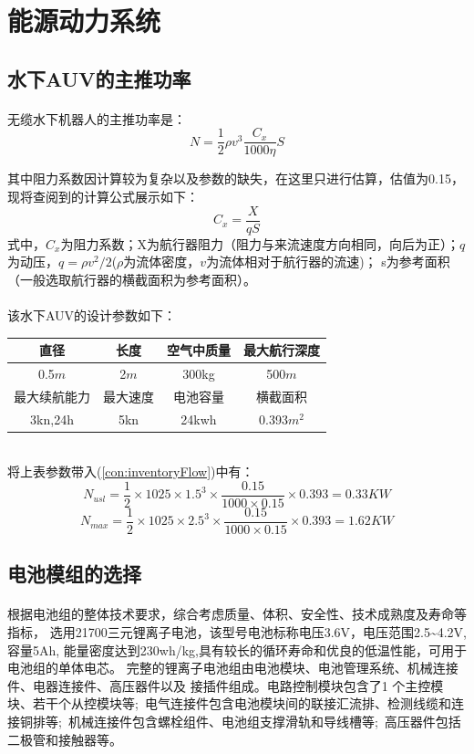 \documentclass{ctexart}
\begin{document}
\section{能源动力系统}
\subsection{水下AUV的主推功率}
\paragraph{}无缆水下机器人的主推功率是：
\begin{equation}
    N=\frac{1}{2}\rho v^3\frac{C_x}{1000\eta}S\label{con:inventoryFlow}
\end{equation}

其中阻力系数因计算较为复杂以及参数的缺失，在这里只进行估算，估值为0.15，现将查阅到的计算公式展示如下：
\[C_x=\frac{X}{qS}\]
式中，$C_x$为阻力系数；X为航行器阻力（阻力与来流速度方向相同，向后为正）；$q$为动压，$q=\rho v^2/2$($\rho$为流体密度，$v$为流体相对于航行器的流速)；
s为参考面积（一般选取航行器的横截面积为参考面积）。
\paragraph{}该水下AUV的设计参数如下： \\
\begin{tabular}{|c|c|c|c|}
    \hline
    直径&长度&空气中质量&最大航行深度 \\
    \hline
    0.5$m$&2$m$&300kg&500$m$ \\
    \hline
    最大续航能力&最大速度&电池容量&横截面积 \\
    \hline
    3kn,24h&5kn&24kwh&0.393$m^2$ \\
    \hline
\end{tabular}\\
将上表参数带入(\ref{con:inventoryFlow})中有：
\[N_{usl}=\frac{1}{2}\times 1025\times 1.5^3 \times \frac{0.15}{1000\times 0.15}\times 0.393=0.33KW\]
\[N_{max}=\frac{1}{2}\times 1025\times 2.5^3 \times \frac{0.15}{1000\times 0.15}\times 0.393=1.62KW\]
\subsection{电池模组的选择}
\paragraph{}根据电池组的整体技术要求，综合考虑质量、体积、安全性、技术成熟度及寿命等指标，
            选用21700三元锂离子电池，该型号电池标称电压3.6V，电压范围2.5\~{}4.2V,容量5Ah,
            能量密度达到230wh/kg,具有较长的循环寿命和优良的低温性能，可用于电池组的单体电芯。
            完整的锂离子电池组由电池模块、电池管理系统、机械连接件、电器连接件、高压器件以及
            接插件组成。电路控制模块包含了1 个主控模块、若干个从控模块等; 电气连接件包含电池模块间的联接汇流排、检测线缆和连接铜排等; 机械连接件包含螺栓组件、电池组支撑滑轨和导线槽等; 高压器件包括二极管和接触器等。
\end{document}
